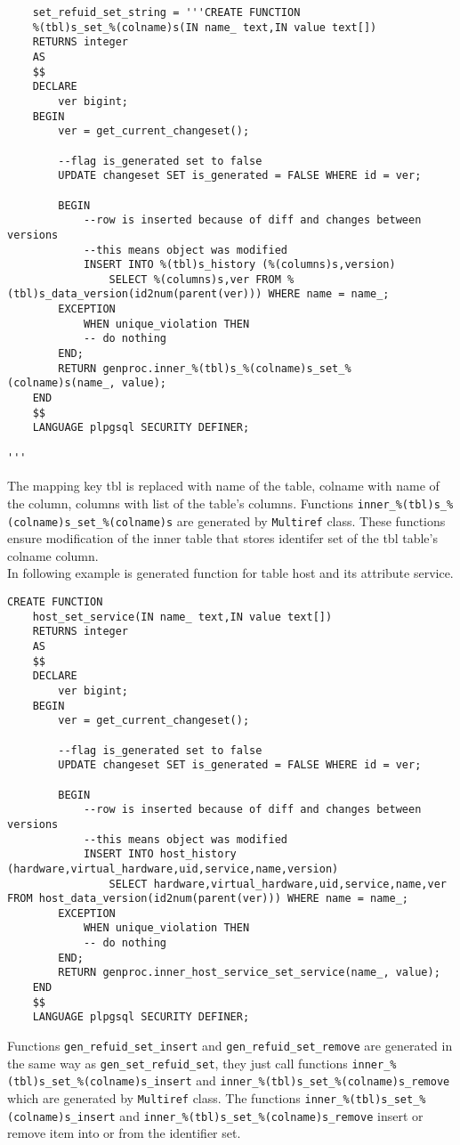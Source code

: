 \documentclass[deska]{subfiles}
\begin{document}
\begin{verbatim}
    set_refuid_set_string = '''CREATE FUNCTION
    %(tbl)s_set_%(colname)s(IN name_ text,IN value text[])
    RETURNS integer
    AS
    $$
    DECLARE
        ver bigint;
    BEGIN
        ver = get_current_changeset();

        --flag is_generated set to false
        UPDATE changeset SET is_generated = FALSE WHERE id = ver;

        BEGIN
            --row is inserted because of diff and changes between versions
            --this means object was modified
            INSERT INTO %(tbl)s_history (%(columns)s,version)
                SELECT %(columns)s,ver FROM %(tbl)s_data_version(id2num(parent(ver))) WHERE name = name_;
        EXCEPTION
            WHEN unique_violation THEN
            -- do nothing
        END;
        RETURN genproc.inner_%(tbl)s_%(colname)s_set_%(colname)s(name_, value);
    END
    $$
    LANGUAGE plpgsql SECURITY DEFINER;

'''
\end{verbatim}

The mapping key tbl is replaced with name of the table, colname with name of the column, columns with list of the table's columns. Functions {\tt inner\_\%(tbl)s\_\%(colname)s\_set\_\%(colname)s} are generated by {\tt Multiref} class. These functions ensure modification of the inner table that stores identifer set of the tbl table's colname column.\\
In following example is generated function for table host and its attribute service.

\begin{verbatim}
CREATE FUNCTION
    host_set_service(IN name_ text,IN value text[])
    RETURNS integer
    AS
    $$
    DECLARE
        ver bigint;
    BEGIN
        ver = get_current_changeset();

        --flag is_generated set to false
        UPDATE changeset SET is_generated = FALSE WHERE id = ver;

        BEGIN
            --row is inserted because of diff and changes between versions
            --this means object was modified
            INSERT INTO host_history (hardware,virtual_hardware,uid,service,name,version)
                SELECT hardware,virtual_hardware,uid,service,name,ver FROM host_data_version(id2num(parent(ver))) WHERE name = name_;
        EXCEPTION
            WHEN unique_violation THEN
            -- do nothing
        END;
        RETURN genproc.inner_host_service_set_service(name_, value);
    END
    $$
    LANGUAGE plpgsql SECURITY DEFINER;
\end{verbatim}

Functions {\tt gen\_refuid\_set\_insert} and {\tt gen\_refuid\_set\_remove} are generated in the same way as {\tt gen\_set\_refuid\_set}, they just call functions {\tt inner\_\%(tbl)s\_set\_\%(colname)s\_insert} and {\tt inner\_\%(tbl)s\_set\_\%(colname)s\_remove} which are generated by {\tt Multiref} class. The functions {\tt inner\_\%(tbl)s\_set\_\%(colname)s\_insert} and {\tt inner\_\%(tbl)s\_set\_\%(colname)s\_remove} insert or remove item into or from the identifier set.
\end{document}

